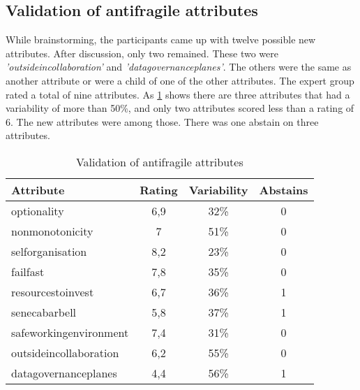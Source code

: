 \subsection{Validation of antifragile attributes}
\label{sub:validationofantifragileattributes}
While brainstorming, the participants came up with twelve possible new \glspl{attribute}. After discussion, only two remained. These two were \textit{'\gls{outsideincollaboration}'} and \textit{'\gls{datagovernanceplanes}'}. The others were the same as another \gls{attribute} or were a child of one of the other \glspl{attribute}. 
The expert group rated a total of nine \glspl{attribute}. As \cref{tab:validationofantifragileattributes} shows there are three \glspl{attribute} that had a variability of more than 50\%, and only two \glspl{attribute} scored less than a rating of 6. The new \glspl{attribute} were among those. There was one abstain on three \glspl{attribute}.
\begin{table}[H]
	\centering
	\begin{tabular}{p{}ccc}
		\toprule
		\textbf{Attribute} & \textbf{Rating} & \textbf{Variability} & \textbf{Abstains} \\
		\midrule
		\Gls{optionality} & 6,9 & 32\% & 0 \\%
		\Gls{nonmonotonicity} & 7 & 51\% & 0 \\%
		\Gls{selforganisation} & 8,2 & 23\% & 0 \\%
		\Gls{failfast} & 7,8 & 35\% & 0 \\%
		\Gls{resourcestoinvest} & 6,7 & 36\% & 1 \\%
		\Gls{senecabarbell} & 5,8 & 37\% & 1 \\%
		\Gls{safeworkingenvironment} & 7,4 & 31\% & 0 \\%
		\Gls{outsideincollaboration} & 6,2 & 55\% & 0 \\%
		\Gls{datagovernanceplanes} & 4,4 & 56\% & 1 \\%
		\bottomrule
	\end{tabular}%
	\caption{Validation of antifragile attributes}
	\label{tab:validationofantifragileattributes}%
\end{table}%

